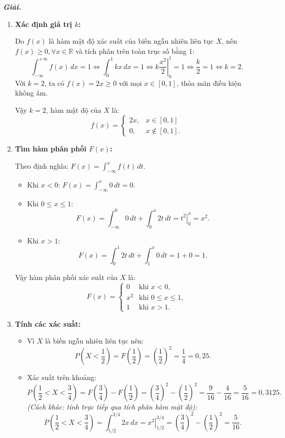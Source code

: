 \documentclass[12pt,a4paper]{article}
\theoremstyle{definition}
\newcommand{\giai}{\noindent\textbf{\textit{Giải.}}\ }
\begin{document}
\giai
\begin{enumerate}[label=\arabic*)]
    \item \textbf{Xác định giá trị $k$:}

    Do $f(x)$ là hàm mật độ xác suất của biến ngẫu nhiên liên tục $X$, nên $f(x) \ge 0, \forall x \in \mathbb{R}$ và tích phân trên toàn trục số bằng 1:
    \[
    \int_{-\infty}^{+\infty} f(x)\,dx = 1 \iff \int_0^1 kx\,dx = 1 \iff \left. k \frac{x^2}{2} \right|_0^1 = 1 \iff \frac{k}{2} = 1 \iff k = 2.
    \]
    Với $k = 2$, ta có $f(x) = 2x \ge 0$ với mọi $x \in [0, 1]$, thỏa mãn điều kiện không âm.

    Vậy $k = 2$, hàm mật độ của $X$ là:
    \[
    f(x) = \begin{cases}
    2x, & x \in [0, 1] \\
    0, & x \notin [0, 1].
    \end{cases}
    \]

    \item \textbf{Tìm hàm phân phối $F(x)$:}

    Theo định nghĩa: $F(x) = \displaystyle\int_{-\infty}^x f(t)\,dt$.
    \begin{itemize}
        \item Khi $x < 0$: $F(x) = \displaystyle\int_{-\infty}^x 0\,dt = 0$.
        \item Khi $0 \le x \le 1$:
        \[
        F(x) = \int_{-\infty}^0 0\,dt + \int_0^x 2t\,dt = \left. t^2 \right|_0^x = x^2.
        \]
        \item Khi $x > 1$:
        \[
        F(x) = \int_0^1 2t\,dt + \int_1^x 0\,dt = 1 + 0 = 1.
        \]
    \end{itemize}
    Vậy hàm phân phối xác suất của $X$ là:
    \[
    F(x) = \begin{cases}
    0 & \text{khi } x < 0, \\
    x^2 & \text{khi } 0 \le x \le 1, \\
    1 & \text{khi } x > 1.
    \end{cases}
    \]

    \item \textbf{Tính các xác suất:}
    \begin{itemize}
        \item Vì $X$ là biến ngẫu nhiên liên tục nên:
        \[
        P\left(X < \frac{1}{2}\right) = F\left(\frac{1}{2}\right) = \left(\frac{1}{2}\right)^2 = \frac{1}{4} = 0{,}25.
        \]
        \item Xác suất trên khoảng:
        \[
        P\left(\frac{1}{2} < X < \frac{3}{4}\right) = F\left(\frac{3}{4}\right) - F\left(\frac{1}{2}\right) = \left(\frac{3}{4}\right)^2 - \left(\frac{1}{2}\right)^2 = \frac{9}{16} - \frac{4}{16} = \frac{5}{16} = 0{,}3125.
        \]
        \textit{(Cách khác: tính trực tiếp qua tích phân hàm mật độ):}
        \[
        P\left(\frac{1}{2} < X < \frac{3}{4}\right) = \int_{1/2}^{3/4} 2x\,dx = \left. x^2 \right|_{1/2}^{3/4} = \left(\frac{3}{4}\right)^2 - \left(\frac{1}{2}\right)^2 = \frac{5}{16}.
        \]
    \end{itemize}
\end{enumerate}
\end{document}
